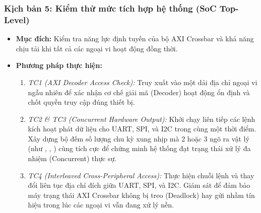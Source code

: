 \subsubsection{Kịch bản 5: Kiểm thử mức tích hợp hệ thống (SoC Top-Level)}
\begin{itemize}
    \item \textbf{Mục đích:} Kiểm tra năng lực định tuyến của bộ AXI Crossbar và khả năng chịu tải khi tất cả các ngoại vi hoạt động đồng thời.
    \item \textbf{Phương pháp thực hiện:}
        \begin{enumerate}
            \item \textit{TC1 (AXI Decoder Access Check):} Truy xuất vào một dải địa chỉ ngoại vi ngẫu nhiên để xác nhận cơ chế giải mã (Decoder) hoạt động ổn định và chốt quyền truy cập đúng thiết bị.
            \item \textit{TC2 \& TC3 (Concurrent Hardware Output):} Khởi chạy liên tiếp các lệnh  kích hoạt phát dữ liệu cho UART, SPI, và I2C trong cùng một thời điểm. Xây dựng bộ đếm số lượng chu kỳ xung nhịp mà 2 hoặc 3 ngõ ra vật lý (như , , ) cùng tích cực để chứng minh hệ thống đạt trạng thái xử lý đa nhiệm (Concurrent) thực sự.
            \item \textit{TC4 (Interleaved Cross-Peripheral Access):} Thực hiện chuỗi lệnh  và  thay đổi liên tục địa chỉ đích giữa UART, SPI, và I2C. Giám sát để đảm bảo máy trạng thái AXI Crossbar không bị treo (Deadlock) hay gửi nhầm tín hiệu trong lúc các ngoại vi vẫn đang xử lý nền.
        \end{enumerate}
\end{itemize}